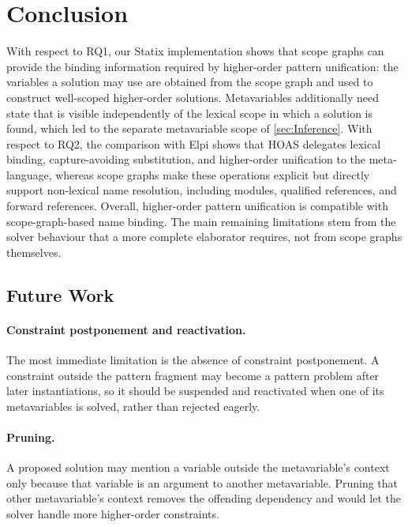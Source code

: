 \section{\label{sec:conclusion}Conclusion}

With respect to RQ1, our Statix implementation shows that scope graphs can
provide the binding information required by higher-order pattern unification:
the variables a solution may use are obtained from the scope graph and used to
construct well-scoped higher-order solutions. Metavariables additionally need
state that is visible independently of the lexical scope in which a solution is
found, which led to the separate metavariable scope of \cref{sec:Inference}.
With respect to RQ2, the comparison with Elpi shows that HOAS delegates lexical
binding, capture-avoiding substitution, and higher-order unification to the
meta-language, whereas scope graphs make these operations explicit but directly
support non-lexical name resolution, including modules, qualified references,
and forward references. Overall, higher-order pattern unification is compatible
with scope-graph-based name binding. The main remaining limitations stem from
the solver behaviour that a more complete elaborator requires, not from scope
graphs themselves.

\subsection{Future Work}
\label{sec:future-work}

\paragraph{Constraint postponement and reactivation.}
The most immediate limitation is the absence of constraint postponement. A
constraint outside the pattern fragment may become a pattern problem after later
instantiations, so it should be suspended and reactivated when one of its
metavariables is solved, rather than rejected eagerly.

\paragraph{Pruning.}
A proposed solution may mention a variable outside the metavariable's context
only because that variable is an argument to another metavariable. Pruning that
other metavariable's context removes the offending dependency and would let the
solver handle more higher-order constraints.


